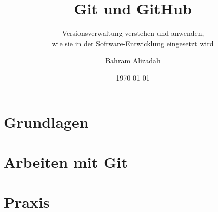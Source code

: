 \documentclass[11pt, a4paper, parskip=half-, headsepline]{scrreprt}
\title{Git und GitHub}
\subtitle{Versionsverwaltung verstehen und anwenden,\\ wie sie in der Software-Entwicklung eingesetzt wird}
\author{Bahram Alizadah}
\date{\today}
\begin{document}
\maketitle
\tableofcontents



\part{Grundlagen}




\part{Arbeiten mit Git}





\part{Praxis}






\appendix


\end{document}
